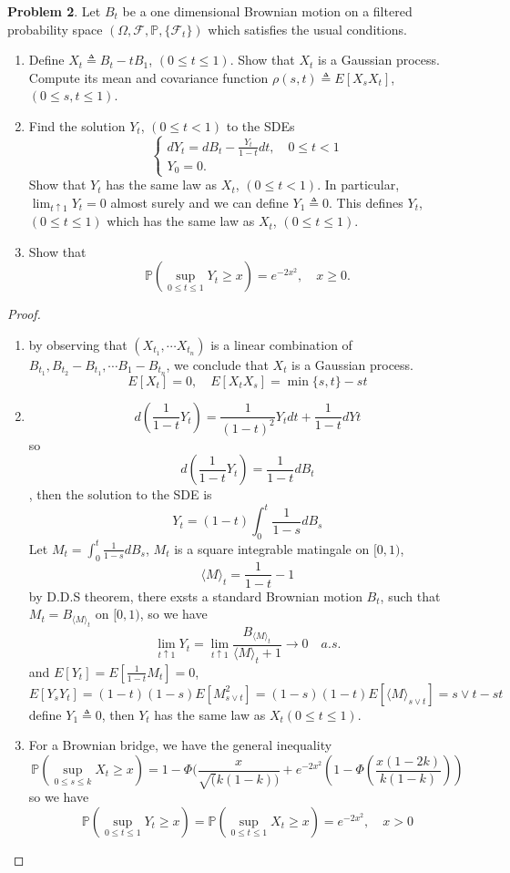 \documentclass{article}     %
\begin{document}
\noindent
\textbf{Problem 2}. Let $B_t$ be a one dimensional Brownian motion on a filtered probability space $(\Omega,\mathcal{F}, \mathbb{P}, \{\mathcal{F}_t\})$ which satisfies the usual conditions.
\begin{enumerate}
    \item Define $X_t \triangleq B_t - t B_1$, $(0\leq t \leq 1)$. Show that $X_t$ is a Gaussian process. Compute its mean and covariance function $\rho(s,t) \triangleq E[X_sX_t]$, $(0\leq s,t\leq 1)$.
    \item Find the solution $Y_t$, $(0\leq t < 1)$ to the SDEs
    \[\begin{cases}
    dY_t = dB_t - \frac{Y_t}{1-t}dt, \quad 0\leq t < 1\\
    Y_0 = 0.\end{cases}\]
    Show that $Y_t$ has the same law as $X_t$, $(0 \leq t < 1)$. In particular, $\lim_{t\uparrow 1} Y_t = 0$ almost surely and we can define $Y_1 \triangleq 0$. This defines $Y_t$, $(0\leq t \leq 1)$ which has the same law as $X_t$, $(0\leq t \leq 1)$.
    \item Show that 
    \[\mathbb{P}(\sup_{0\leq t \leq 1}Y_t \geq x) = e^{-2x^2},\quad x\geq 0.\]
    \end{enumerate}
    \begin{proof}
    \begin{enumerate}
        \item by observing that $(X_{t_1},\cdots X_{t_n})$ is a linear combination of $B_{t_1},B_{t_2}-B_{t_1}, \cdots B_1 - B_{t_n}$, we conclude that $X_t$ is a Gaussian process. 
        \[E[X_t] = 0 ,\quad E[X_tX_s]= \min\{s,t\} - st\]
        \item \[d(\frac{1}{1-t}Y_t) = \frac{1}{(1-t)^2}Y_tdt + \frac{1}{1-t}dYt\]
        so \[d(\frac{1}{1-t}Y_t) = \frac{1}{1-t}dB_t\], then the solution to the SDE is 
        \[Y_t = (1-t)\int_0^t \frac{1}{1-s}dB_s \]
        Let $M_t = \int_0^t \frac{1}{1-s}dB_s$, $M_t$ is a square integrable matingale on $[0,1)$, 
        \[\langle M \rangle_t = \frac{1}{1-t}-1\]
        by D.D.S theorem, there exsts a standard Brownian motion $B_t$, such that $M_t = B_{\langle M \rangle_t}$ on $[0,1)$, so we have 
        \[\lim_{t\uparrow 1}Y_t = \lim_{t\uparrow 1}  \frac{B_{\langle M \rangle_t}}{\langle M \rangle_t + 1}\rightarrow 0 \quad a.s.\]
        and $E[Y_t]= E[\frac{1}{1-t}M_t] = 0 $, 
        \[E[Y_sY_t] = (1-t)(1-s)E[M^2_{s\vee t}] = (1-s)(1-t)E[\langle M \rangle_{s\vee t}] = s\vee t -st\]
        define $Y_1 \triangleq 0$, then $Y_t$ has the same law as $X_t(0\leq t \leq 1)$.    
        \item  
        For a Brownian bridge, we have the general inequality 
        \[\mathbb{P}(\sup_{0\leq s\leq k} X_t \geq x)=1- \Phi(\frac{x}{\sqrt(k(1-k))}+ e^{-2x^2}(1-\Phi(\frac{x(1-2k)}{k(1-k)}))\]
        so we have \[\mathbb{P}(\sup_{0\leq t \leq 1}Y_t \geq x) = \mathbb{P}(\sup_{0\leq t \leq 1} X_t \geq x) = e^{-2x^2},\quad x>0  \] 
    \end{enumerate}
    \end{proof}
    
\end{document}
